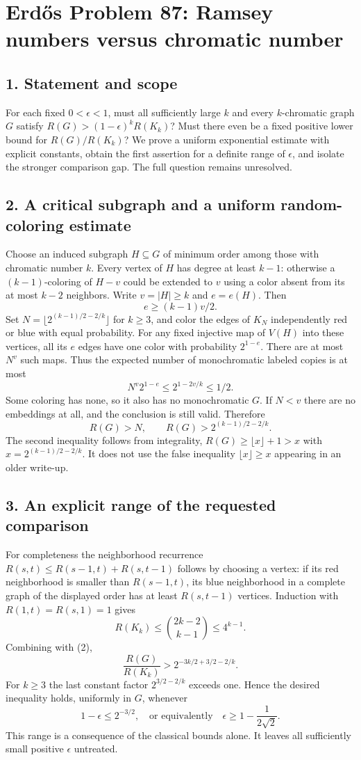 \section*{Erd\H{o}s Problem 87: Ramsey numbers versus chromatic number}

\subsection*{1. Statement and scope}
For each fixed $0<\epsilon<1$, must all sufficiently large $k$ and every $k$-chromatic graph $G$ satisfy $R(G)>(1-\epsilon)^kR(K_k)$? Must there even be a fixed positive lower bound for $R(G)/R(K_k)$? We prove a uniform exponential estimate with explicit constants, obtain the first assertion for a definite range of $\epsilon$, and isolate the stronger comparison gap. The full question remains unresolved.

\subsection*{2. A critical subgraph and a uniform random-coloring estimate}
Choose an induced subgraph $H\subseteq G$ of minimum order among those with chromatic number $k$. Every vertex of $H$ has degree at least $k-1$: otherwise a $(k-1)$-coloring of $H-v$ could be extended to $v$ using a color absent from its at most $k-2$ neighbors. Write $v=|H|\ge k$ and $e=e(H)$. Then
\[
 e\ge(k-1)v/2.\tag{1}
\]
Set $N=\lfloor2^{(k-1)/2-2/k}\rfloor$ for $k\ge3$, and color the edges of $K_N$ independently red or blue with equal probability. For any fixed injective map of $V(H)$ into these vertices, all its $e$ edges have one color with probability $2^{1-e}$. There are at most $N^v$ such maps. Thus the expected number of monochromatic labeled copies is at most
\[
 N^v2^{1-e}\le2^{1-2v/k}\le1/2.
\]
Some coloring has none, so it also has no monochromatic $G$. If $N<v$ there are no embeddings at all, and the conclusion is still valid. Therefore
\[
 R(G)>N,\qquad R(G)>2^{(k-1)/2-2/k}.\tag{2}
\]
The second inequality follows from integrality, $R(G)\ge\lfloor x\rfloor+1>x$ with $x=2^{(k-1)/2-2/k}$. It does not use the false inequality $\lfloor x\rfloor\ge x$ appearing in an older write-up.

\subsection*{3. An explicit range of the requested comparison}
For completeness the neighborhood recurrence $R(s,t)\le R(s-1,t)+R(s,t-1)$ follows by choosing a vertex: if its red neighborhood is smaller than $R(s-1,t)$, its blue neighborhood in a complete graph of the displayed order has at least $R(s,t-1)$ vertices. Induction with $R(1,t)=R(s,1)=1$ gives
\[
 R(K_k)\le\binom{2k-2}{k-1}\le4^{k-1}.
\]
Combining with (2),
\[
 \frac{R(G)}{R(K_k)}>
 2^{-3k/2+3/2-2/k}.\tag{3}
\]
For $k\ge3$ the last constant factor $2^{3/2-2/k}$ exceeds one. Hence the desired inequality holds, uniformly in $G$, whenever
\[
 1-\epsilon\le2^{-3/2},\quad\text{or equivalently}\quad
 \epsilon\ge1-\frac1{2\sqrt2}.
\]
This range is a consequence of the classical bounds alone. It leaves all sufficiently small positive $\epsilon$ untreated.

